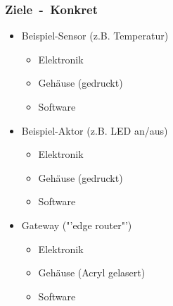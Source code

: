 \documentclass{beamer}
\begin{document}
\begin{frame}
    \frametitle{Ziele~-~Konkret}

    \begin{itemize}
        \item Beispiel-Sensor (z.B. Temperatur)
            \begin{itemize}
                \item Elektronik
                \item Gehäuse (gedruckt)
                \item Software
            \end{itemize}
        \item Beispiel-Aktor (z.B. LED an/aus)
            \begin{itemize}
                \item Elektronik
                \item Gehäuse (gedruckt)
                \item Software
            \end{itemize}
        \item Gateway ("'edge router"')
            \begin{itemize}
                \item Elektronik
                \item Gehäuse (Acryl gelasert)
                \item Software
            \end{itemize}
    \end{itemize}
\end{frame}

%
%
%

\nocite*
{}
\end{document}
